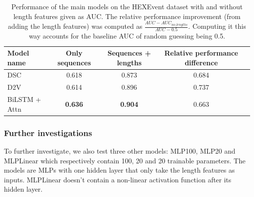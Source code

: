 \begin{table}[h!]
	\centering
	\begin{tabular}{| l | c | c | c| c} 
		\hline
		Model name & Only sequences & Sequences + lengths & Relative performance difference\\
		\hline
		DSC & 0.618 & 0.873 & 0.684\\
		D2V & 0.614 & 0.896 & 0.737\\
		BiLSTM + Attn & \textbf{0.636} & \textbf{0.904} & 0.663\\
		\hline
	\end{tabular}
	\caption{Performance of the main models on the HEXEvent dataset with and without length features given as AUC. The relative performance improvement (from adding the length features) was computed as $\frac{AUC - AUC_{no\_lengths}}{AUC - 0.5}$. Computing it this way accounts for the baseline AUC of random guessing being 0.5.
	}
	\label{table:results_hexevent}
\end{table}

\subsubsection{Further investigations}
To further investigate, we also test three other models: MLP100, MLP20 and MLPLinear which respectively contain 100, 20 and 20 trainable parameters. The models are MLPs with one hidden layer that only take the length features as inputs. MLPLinear doesn't contain a non-linear activation function after its hidden layer.


